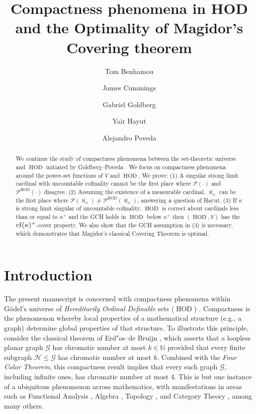 \documentclass[11pt]{amsart}
\title[Compactness phenomena and  Magidor's covering theorem]{Compactness phenomena in HOD and the Optimality of Magidor's Covering theorem}
\author[Benhamou]{Tom Benhamou}
\author[Cummings]{James Cummings}
\author[Goldberg]{Gabriel Goldberg}
\author[Hayut]{Yair Hayut}
\author[Poveda]{Alejandro Poveda}
\theoremstyle{definition}
\theoremstyle{remark}
\DeclareMathOperator{\HOD}{HOD}
\newcommand{\cf}{{\rm cf}}
\begin{document}
\maketitle

\begin{abstract}
We continue the study of compactness phenomena between the set-theoretic universe and $\HOD$ initiated by Goldberg--Poveda \cite{GolPov}. We focus on compactness phenomena around the power-set functions of $V$ and $\HOD$. We prove: (1) A singular strong limit cardinal with uncountable cofinality cannot be the first place where $\mathcal{P}(\cdot )$ and $ \mathcal{P}^{\HOD}(\cdot)$ disagree. (2) Assuming the existence of a measurable cardinal, $\aleph_\omega$ can be the first place where $\mathcal{P}(\aleph_\omega)\neq \mathcal{P}^{\HOD}(\aleph_\omega)$, answering a question of Hayut. (3) If $\kappa$ is strong limit singular of uncountable cofinality, $\HOD$ is correct about cardinals less than or equal to $\kappa^+$ and the GCH holds in $\HOD$ below $\kappa^+$ then $(\HOD, V)$ has the $\cf(\kappa)^+$-cover property. We also show that the GCH assumption in (3) is necessary, which demonstrates that   
Magidor's classical Covering Theorem is optimal.
\end{abstract}

\section{Introduction}
 
The present manuscript is concerned with compactness phenomena within Gödel's universe of \emph{Hereditarily Ordinal Definable} sets ($\HOD$) \cite{Godel}. Compactness is the phenomenon whereby local properties of a mathematical structure (e.g., a graph) determine global properties of that structure. To illustrate this principle, consider the classical theorem of Erd"os--de Bruijn \cite{DeBrujin}, which asserts that a loopless planar graph $\mathcal{G}$ has chromatic number at most $k\in\mathbb{N}$ provided that every finite subgraph $\mathcal{H}\leq\mathcal{G}$ has chromatic number at most $k$. Combined with the \emph{Four Color Theorem}, this compactness result implies that every such graph $\mathcal{G}$, including infinite ones, has chromatic number at most $4$. This is but one instance of a ubiquitous phenomenon across mathematics, with manifestations in areas such as Functional Analysis \cite{Abad,CervantesPoveda}, Algebra \cite{MagidorShelah, EklofMekler, CortesPoveda, CoxPoveda}, Topology \cite{BagMag}, and Category Theory \cite{Bagetal}, among many others.
 
\end{document}
